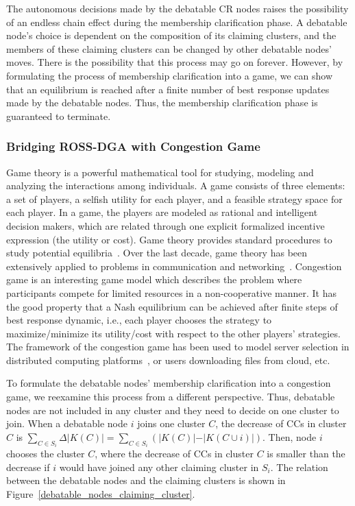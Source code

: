 \documentclass[times]{ettauth}
\newcommand{\ie}{i.e., }
\theoremstyle{mytheoremstyle}
\theoremstyle{mytheoremstyle}
\theoremstyle{mytheoremstyle}
\begin{document}
The autonomous decisions made by the debatable CR nodes raises the possibility of an endless chain effect during the membership clarification phase.
A debatable node's choice is dependent on the composition of its claiming clusters, and the members of these claiming clusters can be changed by other debatable nodes' moves.
There is the possibility that this process may go on forever.
However, by formulating the process of membership clarification into a game, we can show that an equilibrium is reached after a finite number of best response updates made by the debatable nodes.
Thus, the membership clarification phase is guaranteed to terminate.


\subsubsection{Bridging ROSS-DGA with Congestion Game}
\label{clustering:phaseII:game}
Game theory is a powerful mathematical tool for studying, modeling and analyzing the interactions among individuals.
A game consists of three elements: a set of players, a selfish utility for each player, and a feasible strategy space for each player. 
In a game, the players are modeled as rational and intelligent decision makers, which are related through one explicit formalized incentive expression (the utility or cost).
Game theory provides standard procedures to study potential equilibria~\cite{game_for_communication_01}.
Over the last decade, game theory has been extensively applied to problems in communication and networking~\cite{Neel06analysisand, Wang_gtc_crn_survey_2010}.
Congestion game is an interesting game model which describes the problem where participants compete for limited resources in a non-cooperative manner.
It has the good property that a Nash equilibrium can be achieved after finite steps of best response dynamic, \ie each player chooses the strategy to maximize/minimize its utility/cost with respect to the other players' strategies.
The framework of the congestion game has been used to model server selection in distributed computing platforms~\cite{Cloud_Computing_2010}, or users downloading files from cloud, etc.

To formulate the debatable nodes' membership clarification into a congestion game, we reexamine this process from a different perspective. 
Thus, debatable nodes are not included in any cluster and they need to decide on one cluster to join.
When a debatable node $i$ joins one cluster $C$, the decrease of CCs in cluster $C$ is $\sum_{C\in S_i}\Delta\vert K(C) \vert=\sum_{C\in S_i}({\vert K(C) \vert-\vert K(C\cup i) \vert})$.
Then, node $i$ chooses the cluster $C$, where the decrease of CCs in cluster $C$ is smaller than the decrease if $i$ would have joined any other claiming cluster in $S_i$.
The relation between the debatable nodes and the claiming clusters is shown in Figure~\ref{debatable_nodes_claiming_cluster}.
\end{document}
